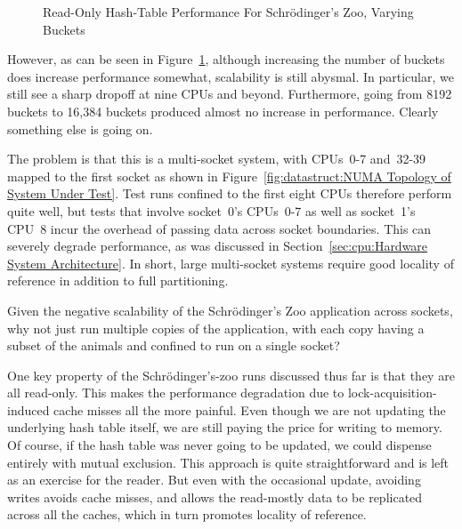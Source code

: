 \begin{figure}[tb]
\centering
{}
\caption{Read-Only Hash-Table Performance For Schr\"odinger's Zoo, Varying Buckets}
\label{fig:datastruct:Read-Only Hash-Table Performance For Schroedinger's Zoo, Varying Buckets}
\end{figure}

However, as can be seen in
Figure~\ref{fig:datastruct:Read-Only Hash-Table Performance For Schroedinger's Zoo, Varying Buckets},
although increasing the number of buckets does increase performance somewhat,
scalability is still abysmal.
In particular, we still see a sharp dropoff at nine CPUs and beyond.
Furthermore, going from 8192 buckets to 16,384 buckets produced almost
no increase in performance.
Clearly something else is going on.

The problem is that this is a multi-socket system, with CPUs~0-7
and~32-39 mapped to the first socket as shown in
Figure~\ref{fig:datastruct:NUMA Topology of System Under Test}.
Test runs confined to the first eight CPUs therefore perform quite
well, but tests that involve socket~0's CPUs~0-7 as well as
socket~1's CPU~8 incur the overhead of passing data across
socket boundaries.
This can severely degrade performance, as was discussed in
Section~\ref{sec:cpu:Hardware System Architecture}.
In short, large multi-socket systems require good locality of reference
in addition to full partitioning.

\QuickQuiz{}
	Given the negative scalability of the Schr\"odinger's
	Zoo application across sockets, why not just run multiple
	copies of the application, with each copy having a subset
	of the animals and confined to run on a single socket?
 \QuickQuizEnd

One key property of the Schr\"odinger's-zoo runs discussed thus far is that
they are all read-only.
This makes the performance degradation due to lock-acquisition-induced
cache misses all the more painful.
Even though we are not updating the underlying hash table itself, we are
still paying the price for writing to memory.
Of course, if the hash table was never going to be updated, we could dispense
entirely with mutual exclusion.
This approach is quite straightforward and is left as an exercise for the
reader.
But even with the occasional update, avoiding writes avoids cache
misses, and allows the read-mostly data to be replicated across all
the caches, which in turn promotes locality of reference.

